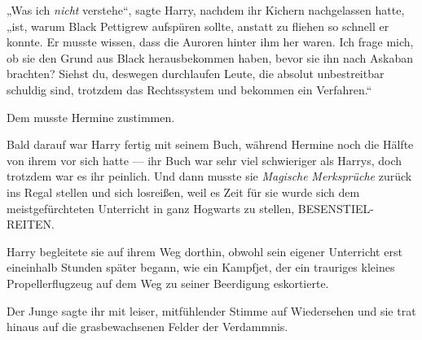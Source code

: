 „Was ich \emph{nicht} verstehe“, sagte Harry, nachdem ihr Kichern nachgelassen hatte, „ist, warum Black Pettigrew aufspüren sollte, anstatt zu fliehen so schnell er konnte. Er musste wissen, dass die Auroren hinter ihm her waren. Ich frage mich, ob sie den Grund aus Black herausbekommen haben, bevor sie ihn nach Askaban brachten? Siehst du, deswegen durchlaufen Leute, die absolut unbestreitbar schuldig sind, trotzdem das Rechtssystem und bekommen ein Verfahren.“

Dem musste Hermine zustimmen.

Bald darauf war Harry fertig mit seinem Buch, während Hermine noch die Hälfte von ihrem vor sich hatte — ihr Buch war sehr viel schwieriger als Harrys, doch trotzdem war es ihr peinlich. Und dann musste sie \emph{Magische} \emph{Merksprüche} zurück ins Regal stellen und sich losreißen, weil es Zeit für sie wurde sich dem meistgefürchteten Unterricht in ganz Hogwarts zu stellen, BESENSTIEL-REITEN.

Harry begleitete sie auf ihrem Weg dorthin, obwohl sein eigener Unterricht erst eineinhalb Stunden später begann, wie ein Kampfjet, der ein trauriges kleines Propellerflugzeug auf dem Weg zu seiner Beerdigung eskortierte.

Der Junge sagte ihr mit leiser, mitfühlender Stimme auf Wiedersehen und sie trat hinaus auf die grasbewachsenen Felder der Verdammnis.

